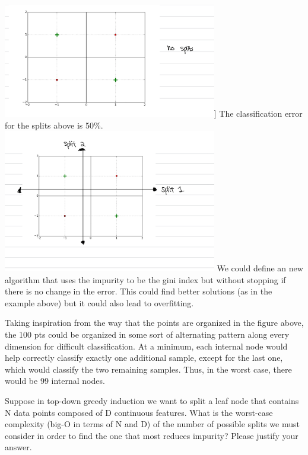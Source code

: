 \begin{solution}
    \begin{center}
        \includegraphics[width=0.7\textwidth]{d1.jpeg}] \newline
        The classification error for the splits above is 50\%.
        \includegraphics[width=0.7\textwidth]{d3.jpeg} \newline
        We could define an new algorithm that uses the impurity to be the gini index but without stopping if there is no change in the error. This could find better solutions (as in the example above) but it could also lead to overfitting.
    \end{center}
    
    Taking inspiration from the way that the points are organized in the figure above, the 100 pts could be organized in some sort of alternating pattern along every dimension for difficult classification. At a minimum, each internal node would help correctly classify exactly one additional sample, except for the last one, which would classify the two remaining samples. Thus, in the worst case, there would be 99 internal nodes.
\end{solution}

\problem[4] Suppose in top-down greedy induction we want to split a leaf node that contains N data points composed of
D continuous features. What is the worst-case
complexity (big-O in terms of N and D) of the number of possible splits we must consider in order to find the one that most reduces impurity? Please justify your answer.

